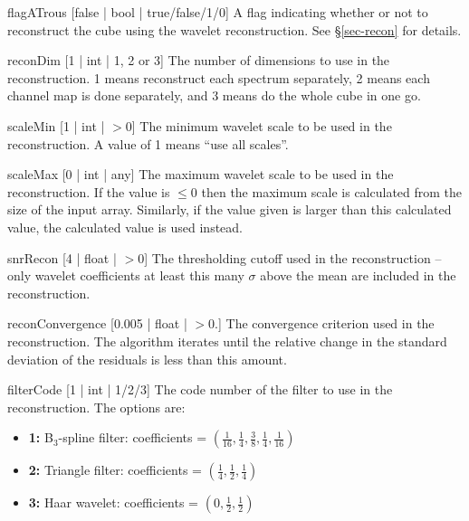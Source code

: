 \begin{Lentry}
\item[{flagATrous [false | bool | true/false/1/0]}] A flag indicating
  whether or not to reconstruct the cube using the \atrous wavelet
  reconstruction. See \S\ref{sec-recon} for details.
\item[{reconDim [1 | int | 1, 2 or 3]}] The number of dimensions to use in
  the reconstruction. 1 means reconstruct each spectrum separately, 2
  means each channel map is done separately, and 3 means do the whole
  cube in one go.
\item[{scaleMin [1 | int | $> 0$]}] The minimum wavelet scale to be
  used in the reconstruction. A value of 1 means ``use all scales''.
\item[{scaleMax [0 | int | any]}] The maximum wavelet scale to be used
  in the reconstruction. If the value is $\le0$ then the maximum scale
  is calculated from the size of the input array. Similarly, if the
  value given is larger than this calculated value, the calculated
  value is used instead.
\item[{snrRecon [4 | float | $> 0$]}] The thresholding cutoff used in
  the reconstruction -- only wavelet coefficients at least this many
  $\sigma$ above the mean are included in the reconstruction.
\item[{reconConvergence [0.005 | float | $> 0.$]}] The convergence
  criterion used in the reconstruction. The \atrous algorithm iterates
  until the relative change in the standard deviation of the residuals
  is less than this amount.
\item[{filterCode [1 | int | 1/2/3]}] The code number of the filter to
  use in the reconstruction. The options are:
  \begin{itemize}
  \item \textbf{1:} B$_3$-spline filter: coefficients = 
    $(\frac{1}{16}, \frac{1}{4}, \frac{3}{8}, \frac{1}{4}, \frac{1}{16})$
  \item \textbf{2:} Triangle filter: coefficients = 
    $(\frac{1}{4}, \frac{1}{2}, \frac{1}{4})$
  \item \textbf{3:} Haar wavelet: coefficients = 
    $(0, \frac{1}{2}, \frac{1}{2})$
  \end{itemize}
\end{Lentry}

